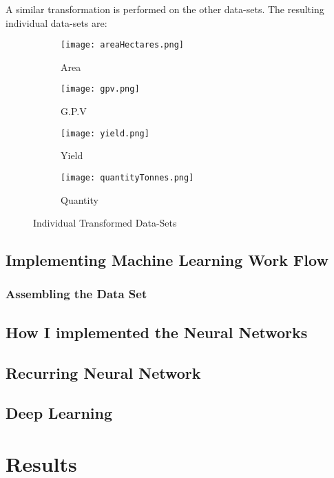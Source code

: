 \documentclass[
]{thesis-ekf}
\begin{document}
A similar transformation is performed on the other data-sets. The resulting individual data-sets are: 
\begin{figure}
	\centering
	\begin{subfigure}{.25\textwidth}
		\centering
		\texttt{[image: areaHectares.png]}
		\caption{Area}
		\label{fig:sub1}
	\end{subfigure}%
	\begin{subfigure}{.24\textwidth}
		\centering
		\texttt{[image: gpv.png]}
		\caption{G.P.V}
		\label{fig:sub2}
	\end{subfigure}
	\begin{subfigure}{.25\textwidth}
		\centering
		\texttt{[image: yield.png]}
		\caption{Yield}
		\label{fig:sub3}
	\end{subfigure}
	\begin{subfigure}{.24\textwidth}
		\centering
		\texttt{[image: quantityTonnes.png]}
		\caption{Quantity}
		\label{fig:sub4}
	\end{subfigure}

	\caption{Individual Transformed Data-Sets}
	\label{fig:heads}
\end{figure}



\section{Implementing Machine Learning Work Flow}





\subsection{Assembling the Data Set}
\section{How I implemented the Neural Networks}
\section{Recurring Neural Network}
\section{Deep Learning}

\chapter{Results}
\end{document}
